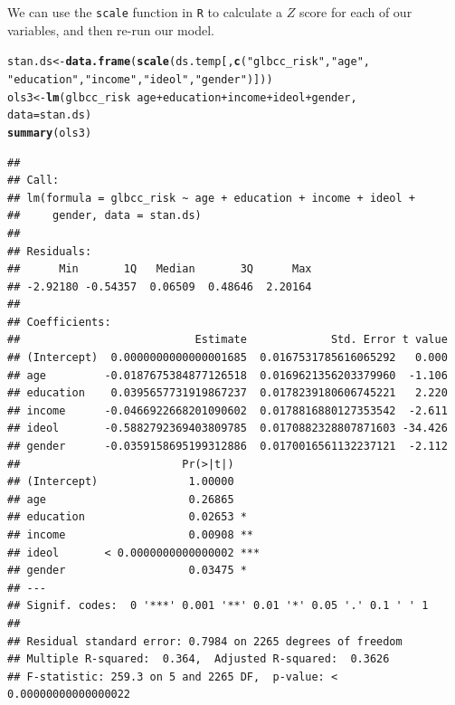 \documentclass[11pt,openany]{book}\usepackage[]{graphicx}\usepackage[]{color}
\makeatletter
\newcommand{\hlstr}[1]{\textcolor[rgb]{0.192,0.494,0.8}{#1}}%
\newcommand{\hlopt}[1]{\textcolor[rgb]{0,0,0}{#1}}%
\newcommand{\hlstd}[1]{\textcolor[rgb]{0.345,0.345,0.345}{#1}}%
\newcommand{\hlkwb}[1]{\textcolor[rgb]{0.69,0.353,0.396}{#1}}%
\newcommand{\hlkwc}[1]{\textcolor[rgb]{0.333,0.667,0.333}{#1}}%
\newcommand{\hlkwd}[1]{\textcolor[rgb]{0.737,0.353,0.396}{\textbf{#1}}}%
\newenvironment{kframe}{%
 \def\at@end@of@kframe{}%
 \ifinner\ifhmode%
  \def\at@end@of@kframe{\end{minipage}}%
  \begin{minipage}{\columnwidth}%
 \fi\fi%
 \def\FrameCommand##1{\hskip\@totalleftmargin \hskip-\fboxsep
 \colorbox{shadecolor}{##1}\hskip-\fboxsep
     \hskip-\linewidth \hskip-\@totalleftmargin \hskip\columnwidth}%
 \MakeFramed {\advance\hsize-\width
   \@totalleftmargin\z@ \linewidth\hsize
   \@setminipage}}%
 {\par\unskip\endMakeFramed%
 \at@end@of@kframe}
\newenvironment{knitrout}{}{} %
\renewenvironment{knitrout}{\begin{singlespace}}{\end{singlespace}}
\makeatother
\begin{document}
We can use the \texttt{scale} function in \texttt{R} to calculate a $Z$ score for each of our variables, and then re-run our model. 
\begin{knitrout}
\color{fgcolor}\begin{kframe}
\begin{alltt}
\hlstd{stan.ds} \hlkwb{<-} \hlkwd{data.frame}\hlstd{(}\hlkwd{scale}\hlstd{(ds.temp[,} \hlkwd{c}\hlstd{(}\hlstr{"glbcc_risk"}\hlstd{,} \hlstr{"age"}\hlstd{,}
    \hlstr{"education"}\hlstd{,} \hlstr{"income"}\hlstd{,} \hlstr{"ideol"}\hlstd{,} \hlstr{"gender"}\hlstd{)]))}
\hlstd{ols3} \hlkwb{<-} \hlkwd{lm}\hlstd{(glbcc_risk} \hlopt{~} \hlstd{age} \hlopt{+} \hlstd{education} \hlopt{+} \hlstd{income} \hlopt{+} \hlstd{ideol} \hlopt{+} \hlstd{gender,}
    \hlkwc{data} \hlstd{= stan.ds)}
\hlkwd{summary}\hlstd{(ols3)}
\end{alltt}
\begin{verbatim}
## 
## Call:
## lm(formula = glbcc_risk ~ age + education + income + ideol + 
##     gender, data = stan.ds)
## 
## Residuals:
##      Min       1Q   Median       3Q      Max 
## -2.92180 -0.54357  0.06509  0.48646  2.20164 
## 
## Coefficients:
##                           Estimate             Std. Error t value
## (Intercept)  0.0000000000000001685  0.0167531785616065292   0.000
## age         -0.0187675384877126518  0.0169621356203379960  -1.106
## education    0.0395657731919867237  0.0178239180606745221   2.220
## income      -0.0466922668201090602  0.0178816880127353542  -2.611
## ideol       -0.5882792369403809785  0.0170882328807871603 -34.426
## gender      -0.0359158695199312886  0.0170016561132237121  -2.112
##                         Pr(>|t|)    
## (Intercept)              1.00000    
## age                      0.26865    
## education                0.02653 *  
## income                   0.00908 ** 
## ideol       < 0.0000000000000002 ***
## gender                   0.03475 *  
## ---
## Signif. codes:  0 '***' 0.001 '**' 0.01 '*' 0.05 '.' 0.1 ' ' 1
## 
## Residual standard error: 0.7984 on 2265 degrees of freedom
## Multiple R-squared:  0.364,	Adjusted R-squared:  0.3626 
## F-statistic: 259.3 on 5 and 2265 DF,  p-value: < 0.00000000000000022
\end{verbatim}
\end{kframe}
\end{knitrout}
\end{document}
